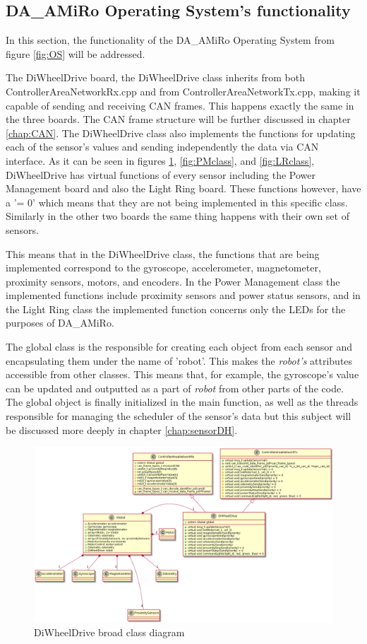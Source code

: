 \documentclass[12pt]{report}%
\begin{document}
\subsection{DA\_AMiRo Operating System's functionality}
\label{sub:DAAMIROOS}
In this section, the functionality of the DA\_AMiRo Operating System from figure \ref{fig:OS} will be addressed.

The DiWheelDrive board, the DiWheelDrive class inherits from both ControllerAreaNetworkRx.cpp and from ControllerAreaNetworkTx.cpp, making it capable of sending and receiving CAN frames. This happens exactly the same in the three boards. The CAN frame structure will be further discussed in chapter \ref{chap:CAN}. The DiWheelDrive class also implements the functions for updating each of the sensor's values and sending independently the data via CAN interface. As it can be seen in figures \ref{fig:DWDclass}, \ref{fig:PMclass}, and \ref{fig:LRclass}, DiWheelDrive has virtual functions of every sensor including the Power Management board and also the Light Ring board. These functions however, have a '= 0' which means that they are not being implemented in this specific class. Similarly in the other two boards the same thing happens with their own set of sensors.

This means that in the DiWheelDrive class, the functions that are being implemented correspond to the gyroscope, accelerometer, magnetometer, proximity sensors, motors, and encoders. In the Power Management class the implemented functions include proximity sensors and power status sensors, and in the Light Ring class the implemented function concerns only the LEDs for the purposes of DA\_AMiRo.

The global class is the responsible for creating each object from each sensor and encapsulating them under the name of 'robot'. This makes the \textit{robot's} attributes accessible from other classes. This means that, for example, the gyroscope's value can be updated and outputted as a part of \textit{robot} from other parts of the code. The global object is finally initialized in the main function, as well as the threads responsible for managing the scheduler of the sensor's data but this subject will be discussed more deeply in chapter \ref{chap:sensorDH}.

\begin{figure}[ht]
	\centering
	\includegraphics[width=\textwidth]{DWDclass}
    \caption{DiWheelDrive broad class diagram}
    \label{fig:DWDclass}
\end{figure}
\end{document}
